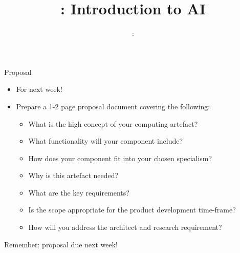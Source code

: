 
\usepackage{../../beamerthemeFalmouthGamesAcademy}
\usepackage{multimedia}
\graphicspath{ {../../} }


\usepackage[normalem]{ulem}
\usepackage{wasysym}

\usepackage{pifont}%
\newcommand{\cmark}{\ding{51}}%
\newcommand{\xmark}{\ding{55}}%

\usepackage{algpseudocode}

\usepackage{pdfpages}

\usetikzlibrary{arrows,automata}




\title{\sessionnumber: Introduction to AI}
\subtitle{\modulecode: \moduletitle}

\frame{\titlepage} 

\begin{frame}{Proposal}
        \begin{itemize}
                \pause\item For next week!
                \pause\item Prepare a 1-2 page proposal document covering the following:
                \begin{itemize}
                        \pause\item What is the high concept of your computing artefact?
                        \pause\item What functionality will your component include?
                        \pause\item How does your component fit into your chosen specialism?
                        \pause\item Why is this artefact needed?
                        \pause\item What are the key requirements?
                        \pause\item Is the scope appropriate for the product development time-frame?
                        \pause\item How will you address the architect and research requirement?
                \end{itemize}
        \end{itemize}
\end{frame}
    
%
%


\begin{frame}
        \begin{center}
                \huge Remember: proposal due next week!
        \end{center}
\end{frame}


